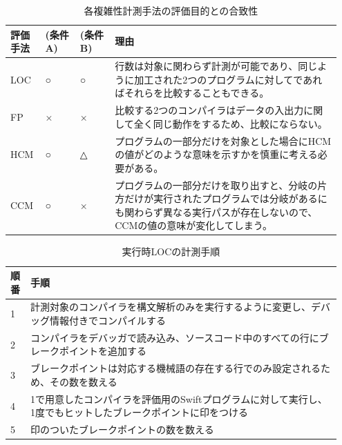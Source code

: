 \begin{table}[!hbtp]
    \begin{center}
        \caption{各複雑性計測手法の評価目的との合致性}
        \begin{tabular}{|p{0.1\linewidth}|p{0.1\linewidth}|p{0.1\linewidth}|p{0.65\linewidth}|}
            \hline
            評価手法 & (条件A) & (条件B) & 理由\\
            \hline
            \hline
            LOC & ○ & ○ & 行数は対象に関わらず計測が可能であり、同じように加工された2つのプログラムに対してであればそれらを比較することもできる。\\
            \hline
            FP & × & × & 比較する2つのコンパイラはデータの入出力に関して全く同じ動作をするため、比較にならない。\\
            \hline
            HCM & ○ & △ & プログラムの一部分だけを対象とした場合にHCMの値がどのような意味を示すかを慎重に考える必要がある。\\
            \hline
            CCM & ○ & × & プログラムの一部分だけを取り出すと、分岐の片方だけが実行されたプログラムでは分岐があるにも関わらず異なる実行パスが存在しないので、CCMの値の意味が変化してしまう。\\
            \hline
        \end{tabular}
        \label{table:evaluation-property}
    \end{center}
\end{table}

\begin{table}[!hbtp]
    \begin{center}
        \caption{実行時LOCの計測手順}
        \begin{tabular}{|p{0.05\linewidth}|p{0.9\linewidth}|}
            \hline
            順番 & 手順 \\
            \hline
            \hline
            1 & 計測対象のコンパイラを構文解析のみを実行するように変更し、デバッグ情報付きでコンパイルする \\
            \hline
            2 & コンパイラをデバッガで読み込み、ソースコード中のすべての行にブレークポイントを追加する \\
            \hline
            3 & ブレークポイントは対応する機械語の存在する行でのみ設定されるため、その数を数える \\
            \hline
            4 & 1で用意したコンパイラを評価用のSwiftプログラムに対して実行し、1度でもヒットしたブレークポイントに印をつける \\
            \hline
            5 & 印のついたブレークポイントの数を数える \\
            \hline
        \end{tabular}
        \label{table:complexity-measure}
    \end{center}
\end{table}

